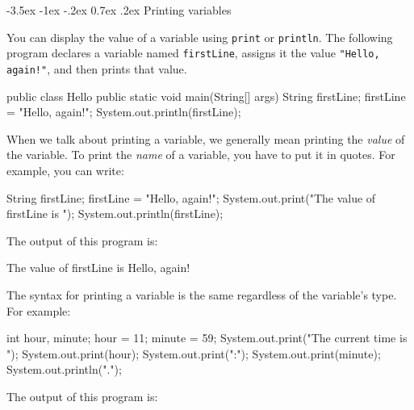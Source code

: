 \documentclass[12pt]{book}
\makeatletter
\renewcommand{\section}{\@startsection {section}{1}{\z@}%
    {-3.5ex \@plus -1ex \@minus -.2ex}%
    {0.7ex \@plus.2ex}%
    {\normalfont\Large\bfseries}}
\theoremstyle{exercise}
\newcommand{\java}[1]{\lstinline{#1}} %
\makeatother
\begin{document}


\section{Printing variables}
\label{sec:printvar}

You can display the value of a variable using \java{print} or \java{println}.
The following program declares a variable named \java{firstLine}, assigns it the value \java{"Hello, again!"}, and then prints that value.

\begin{code}
public class Hello {
    public static void main(String[] args) {
        String firstLine;
        firstLine = "Hello, again!";
        System.out.println(firstLine);
    }
}
\end{code}

When we talk about printing a variable, we generally mean printing the {\em value} of the variable.
To print the {\em name} of a variable, you have to put it in quotes.
For example, you can write:

\begin{code}
    String firstLine;
    firstLine = "Hello, again!";
    System.out.print("The value of firstLine is ");
    System.out.println(firstLine);
\end{code}

The output of this program is:

\begin{stdout}
The value of firstLine is Hello, again!
\end{stdout}


The syntax for printing a variable is the same regardless of the variable's type.
For example:

\begin{code}
    int hour, minute;
    hour = 11;
    minute = 59;
    System.out.print("The current time is ");
    System.out.print(hour);
    System.out.print(":");
    System.out.print(minute);
    System.out.println(".");
\end{code}

The output of this program is:
\end{document}
